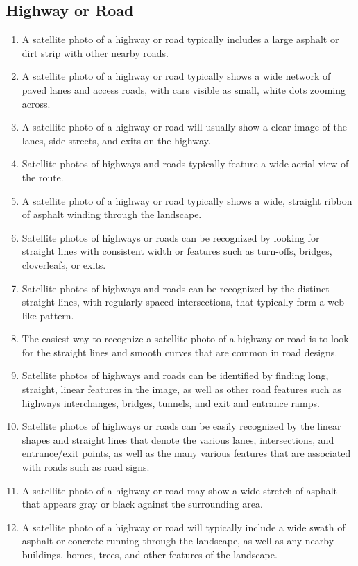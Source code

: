 \documentclass[11pt]{article}
\begin{document}
\subsection{Highway or Road}
\begin{enumerate}
\item A satellite photo of a highway or road typically includes a large asphalt or dirt strip with other nearby roads.
\item A satellite photo of a highway or road typically shows a wide network of paved lanes and access roads, with cars visible as small, white dots zooming across.
\item A satellite photo of a highway or road will usually show a clear image of the lanes, side streets, and exits on the highway.
\item Satellite photos of highways and roads typically feature a wide aerial view of the route.
\item A satellite photo of a highway or road typically shows a wide, straight ribbon of asphalt winding through the landscape.
\item Satellite photos of highways or roads can be recognized by looking for straight lines with consistent width or features such as turn-offs, bridges, cloverleafs, or exits.
\item Satellite photos of highways and roads can be recognized by the distinct straight lines, with regularly spaced intersections, that typically form a web-like pattern.
\item The easiest way to recognize a satellite photo of a highway or road is to look for the straight lines and smooth curves that are common in road designs.
\item Satellite photos of highways and roads can be identified by finding long, straight, linear features in the image, as well as other road features such as highways interchanges, bridges, tunnels, and exit and entrance ramps.
\item Satellite photos of highways or roads can be easily recognized by the linear shapes and straight lines that denote the various lanes, intersections, and entrance/exit points, as well as the many various features that are associated with roads such as road signs.
\item A satellite photo of a highway or road may show a wide stretch of asphalt that appears gray or black against the surrounding area.
\item A satellite photo of a highway or road will typically include a wide swath of asphalt or concrete running through the landscape, as well as any nearby buildings, homes, trees, and other features of the landscape.

\end{enumerate}
\end{document}
